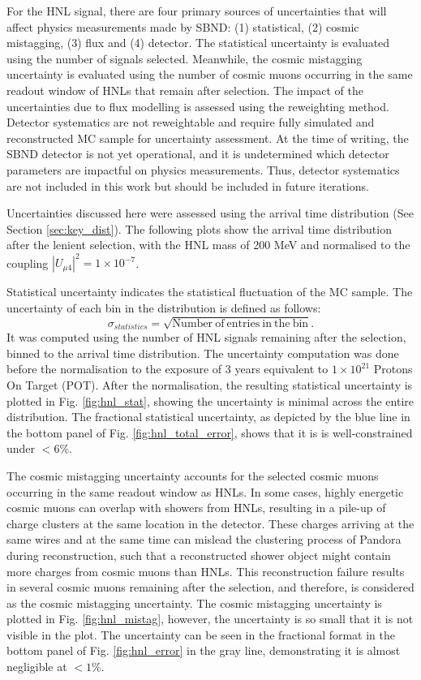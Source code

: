 For the HNL signal, there are four primary sources of uncertainties that will affect physics measurements made by SBND: (1) statistical, (2) cosmic mistagging, (3) flux and (4) detector. 
The statistical uncertainty is evaluated using the number of signals selected.
Meanwhile, the cosmic mistagging uncertainty is evaluated using the number of cosmic muons occurring in the same readout window of HNLs that remain after selection.
The impact of the uncertainties due to flux modelling is assessed using the reweighting method.
Detector systematics are not reweightable and require fully simulated and reconstructed MC sample for uncertainty assessment.
At the time of writing, the SBND detector is not yet operational, and it is undetermined which detector parameters are impactful on physics measurements.
Thus, detector systematics are not included in this work but should be included in future iterations.

Uncertainties discussed here were assessed using the arrival time distribution (See Section \ref{sec:key_dist}).
The following plots show the arrival time distribution after the lenient selection, with the HNL mass of 200 MeV and normalised to the coupling $|U_{\mu4}|^2 = 1 \times 10^{-7}$.

Statistical uncertainty indicates the statistical fluctuation of the MC sample.
The uncertainty of each bin in the distribution is defined as follows:
\begin{equation}
\label{eq:stat_err}
\sigma_{statistics} = \sqrt{\mathrm{Number\ of\ entries\ in\ the\ bin}}.
\end{equation}
It was computed using the number of HNL signals remaining after the selection, binned to the arrival time distribution.
The uncertainty computation was done before the normalisation to the exposure of 3 years equivalent to $1 \times 10^{21}$ Protons On Target (POT).
After the normalisation, the resulting statistical uncertainty is plotted in Fig. \ref{fig:hnl_stat}, showing the uncertainty is minimal across the entire distribution.
The fractional statistical uncertainty, as depicted by the blue line in the bottom panel of Fig. \ref{fig:hnl_total_error}, shows that it is is well-constrained under $< 6\%$.

The cosmic mistagging uncertainty accounts for the selected cosmic muons occurring in the same readout window as HNLs.
In some cases, highly energetic cosmic muons can overlap with showers from HNLs, resulting in a pile-up of charge clusters at the same location in the detector.
These charges arriving at the same wires and at the same time can mislead the clustering process of Pandora during reconstruction, such that a reconstructed shower object might contain more charges from cosmic muons than HNLs.
This reconstruction failure results in several cosmic muons remaining after the selection, and therefore, is considered as the cosmic mistagging uncertainty.
The cosmic mistagging uncertainty is plotted in Fig. \ref{fig:hnl_mistag}, however, the uncertainty is so small that it is not visible in the plot.
The uncertainty can be seen in the fractional format in the bottom panel of Fig. \ref{fig:hnl_error} in the gray line, demonstrating it is almost negligible at $< 1\%$. 

